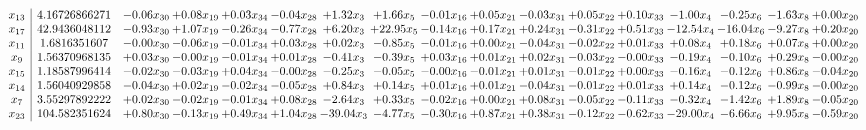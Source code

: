 \documentclass[9pt]{article}
\begin{document}
 \[\begin{array}{c| c c@{\hskip 2pt} c@{\hskip 2pt} c@{\hskip 2pt} c@{\hskip 2pt} c@{\hskip 2pt} c@{\hskip 2pt} c@{\hskip 2pt} c@{\hskip 2pt} c@{\hskip 2pt} c@{\hskip 2pt} c@{\hskip 2pt} c@{\hskip 2pt} c@{\hskip 2pt} c@{\hskip 2pt} c@{\hskip 2pt} }
 x_{13}   &  4.16726866271 & -0.06 x_{30} & +  0.08 x_{19} & +  0.03 x_{34} & -0.04 x_{28} & +  1.32 x_{3} & +  1.66 x_{5} & -0.01 x_{16} & +  0.05 x_{21} & -0.03 x_{31} & +  0.05 x_{22} & +  0.10 x_{33} & -1.00 x_{4} & -0.25 x_{6} & -1.63 x_{8} & +  0.00 x_{20}\\
 x_{17}   &  42.9436048112 & -0.93 x_{30} & +  1.07 x_{19} & -0.26 x_{34} & -0.77 x_{28} & +  6.20 x_{3} & + 22.95 x_{5} & -0.14 x_{16} & +  0.17 x_{21} & +  0.24 x_{31} & -0.31 x_{22} & +  0.51 x_{33} & -12.54 x_{4} & -16.04 x_{6} & -9.27 x_{8} & +  0.20 x_{20}\\
 x_{11}   &  1.6816351607 & -0.00 x_{30} & -0.06 x_{19} & -0.01 x_{34} & +  0.03 x_{28} & +  0.02 x_{3} & -0.85 x_{5} & -0.01 x_{16} & +  0.00 x_{21} & -0.04 x_{31} & -0.02 x_{22} & +  0.01 x_{33} & +  0.08 x_{4} & +  0.18 x_{6} & +  0.07 x_{8} & +  0.00 x_{20}\\
 x_{9}   &  1.56370968135 & +  0.03 x_{30} & -0.00 x_{19} & -0.01 x_{34} & +  0.01 x_{28} & -0.41 x_{3} & -0.39 x_{5} & +  0.03 x_{16} & +  0.01 x_{21} & +  0.02 x_{31} & -0.03 x_{22} & -0.00 x_{33} & -0.19 x_{4} & -0.10 x_{6} & +  0.29 x_{8} & -0.00 x_{20}\\
 x_{15}   &  1.18587996414 & -0.02 x_{30} & -0.03 x_{19} & +  0.04 x_{34} & -0.00 x_{28} & -0.25 x_{3} & -0.05 x_{5} & -0.00 x_{16} & -0.01 x_{21} & +  0.01 x_{31} & -0.01 x_{22} & +  0.00 x_{33} & -0.16 x_{4} & -0.12 x_{6} & +  0.86 x_{8} & -0.04 x_{20}\\
 x_{14}   &  1.56040929858 & -0.04 x_{30} & +  0.02 x_{19} & -0.02 x_{34} & -0.05 x_{28} & +  0.84 x_{3} & +  0.14 x_{5} & +  0.01 x_{16} & +  0.01 x_{21} & -0.04 x_{31} & -0.01 x_{22} & +  0.01 x_{33} & +  0.14 x_{4} & -0.12 x_{6} & -0.99 x_{8} & -0.00 x_{20}\\
 x_{7}   &  3.55297892222 & +  0.02 x_{30} & -0.02 x_{19} & -0.01 x_{34} & +  0.08 x_{28} & -2.64 x_{3} & +  0.33 x_{5} & -0.02 x_{16} & +  0.00 x_{21} & +  0.08 x_{31} & -0.05 x_{22} & -0.11 x_{33} & -0.32 x_{4} & -1.42 x_{6} & +  1.89 x_{8} & -0.05 x_{20}\\
 x_{23}   &  104.582351624 & +  0.80 x_{30} & -0.13 x_{19} & +  0.49 x_{34} & +  1.04 x_{28} & -39.04 x_{3} & -4.77 x_{5} & -0.30 x_{16} & +  0.87 x_{21} & +  0.38 x_{31} & -0.12 x_{22} & -0.62 x_{33} & -29.00 x_{4} & -6.66 x_{6} & +  9.95 x_{8} & -0.59 x_{20}\\

\end{array}\]
\end{document}
